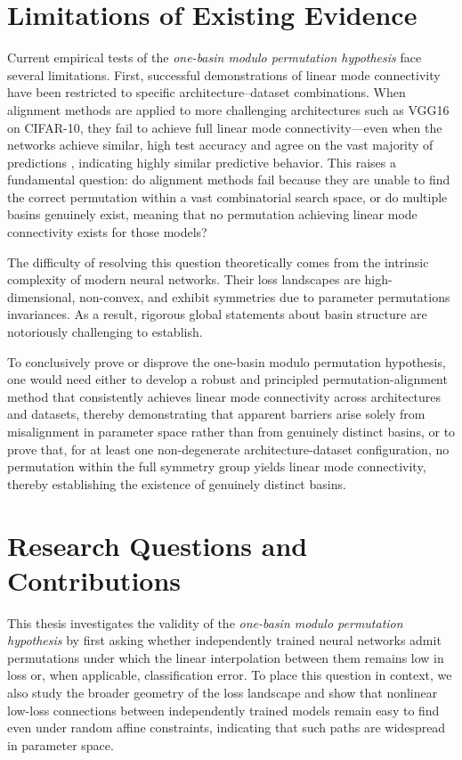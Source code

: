 \documentclass[11pt,a4paper]{report}
\begin{document}
\section{Limitations of Existing Evidence}

Current empirical tests of the \textit{one-basin modulo permutation hypothesis} face several limitations. 
First, successful demonstrations of linear mode connectivity have been restricted 
to specific architecture–dataset combinations. When alignment methods are applied 
to more challenging architectures such as VGG16 on CIFAR-10, they fail to achieve 
full linear mode connectivity—even when the networks achieve similar, high test 
accuracy and agree on the vast majority of predictions \citet{ainsworth2023git}, indicating highly similar predictive behavior. This raises a fundamental question: do alignment methods fail because they are unable to find the correct permutation within a vast combinatorial search space, or do multiple basins genuinely exist, meaning that no permutation achieving linear mode connectivity exists for those models?

The difficulty of resolving this question theoretically comes from the intrinsic 
complexity of modern neural networks. Their loss landscapes are high-dimensional, 
non-convex, and exhibit symmetries due to parameter permutations invariances. As a result, rigorous global statements about basin structure 
are notoriously challenging to establish.

To conclusively prove or disprove the one-basin modulo permutation hypothesis, one would need either to develop a robust and principled permutation-alignment method that consistently achieves linear mode connectivity across architectures and datasets, thereby demonstrating that apparent barriers arise solely from misalignment in parameter space rather than from genuinely distinct basins, or to prove that, for at least one non-degenerate architecture-dataset configuration, no permutation within the full symmetry group yields linear mode connectivity, thereby establishing the existence of genuinely distinct basins.

\section{Research Questions and Contributions}

This thesis investigates the validity of the \textit{one-basin modulo permutation hypothesis} by first asking whether independently trained neural networks admit permutations under which the linear interpolation between them remains low in loss or, when applicable, classification error. To place this question in context, we also study the broader geometry of the loss landscape and show that nonlinear low-loss connections between independently trained models remain easy to find even under random affine constraints, indicating that such paths are widespread in parameter space.
\end{document}
